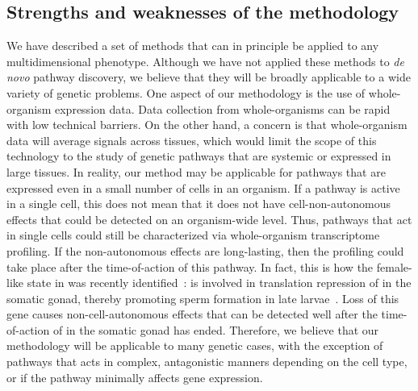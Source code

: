 \subsection*{Strengths and weaknesses of the methodology}
We have described a set of methods that can in principle be applied to
any multidimensional phenotype. Although we have not applied these methods to
\emph{de novo} pathway discovery, we believe that they will be broadly
applicable to a wide variety of genetic problems. One aspect of our methodology
is the use of whole-organism expression data. Data collection from
whole-organisms can be rapid with low technical barriers. On the other
hand, a concern is that whole-organism data will average signals across tissues,
which would limit the scope of this technology to the study of genetic pathways
that are systemic or expressed in large tissues. In
reality, our method may be applicable for pathways that are expressed even in a
small number of cells in an organism. If a pathway is active in a single cell,
this does not mean that it does not have cell-non-autonomous effects that could
be detected on an organism-wide level. Thus,
pathways that act in single cells could still be
characterized via whole-organism transcriptome profiling. If the non-autonomous
effects are long-lasting, then the profiling could take place after the
time-of-action of this pathway. In fact, this is how the female-like state in
\cel{} was recently identified~\citep{Angeles-Albores2017a}:  is
involved in translation repression of  in the somatic gonad,
thereby promoting sperm formation in late larvae~\citep{Clifford2000}.
Loss of this gene causes non-cell-autonomous effects that can be detected well
after the time-of-action of  in the somatic gonad has ended.
Therefore, we believe that our methodology will be applicable to many
genetic cases, with the exception of pathways that
acts in complex, antagonistic manners depending on the cell type, or if
the pathway minimally affects gene expression.


